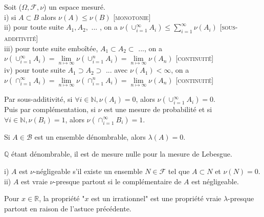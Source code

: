 \documentclass[landscape,twocolumn]{article}
\begin{document}
\begin{prop}
Soit ($\Omega, \mathcal{F}, \nu $) un espace mesuré. \\
i) si $A \subset B$ alors $\nu(A) \leqslant \nu(B)$ \textsc{[monotonie]} \\
ii) pour toute suite $A_1, A_2,$ ... , on a $\nu ( \cup_{i=1}^{\infty} A_i) \leqslant \sum \limits_{i=1}^{\infty} \nu (A_i)$ \textsc{[sous-additivité]} \\
iii) pour toute suite emboîtée, $A_1 \subset A_2 \subset$ ..., on a \\
 $\nu ( \cup_{i=1}^{\infty} A_i) = \lim \limits_{n \mapsto \infty} \nu( \cup_{i=1}^{n} A_i) = \lim \limits_{n \mapsto \infty} \nu (A_n)$ \textsc{[continuité]} \\
iv) pour toute suite $A_1 \supset A_2 \supset$ ... avec $\nu (A_1) < \infty$, on a \\
$\nu ( \cap_{i=1}^{\infty} A_i) = \lim \limits_{n \mapsto \infty} \nu ( \cap_{i=1}^{n} A_i) = \lim \limits_{n \mapsto \infty} \nu (A_n)$ \textsc{[continuité]}
\end{prop}

\begin{lemme}
Par sous-additivité, si $\forall i \in \mathbb{N}, \nu (A_i) = 0$, alors $\nu (\cup_{i=1}^{\infty} A_i)=0$. \\
Puis par complémentation, si $\nu$ est une mesure de probabilité et si $\forall i \in \mathbb{N}, \nu (B_i)=1$, alors $\nu (\cap_{i=1}^{\infty} B_i)=1$.
\end{lemme}

\begin{coro}
Si $A \in \mathcal{B}$ est un ensemble dénombrable, alors $\lambda (A) =0$.
\end{coro}

\begin{astu}
$\mathbb{Q}$ étant dénombrable, il est de mesure nulle pour la mesure de Lebesgue.
\end{astu}

\begin{defin}
i) $A$ est $\nu$-négligeable s'il existe un ensemble $N \in \mathcal{F}$ tel que $A \subset N$ et $\nu (N)=0$. \\
ii) $A$ est vraie $\nu$-presque partout si le complémentaire de $A$ est négligeable.
\end{defin}

\begin{exe}
Pour $x \in \mathbb{R}$, la propriété "$x$ est un irrationnel" est une propriété vraie $\lambda$-presque partout en raison de l'astuce précédente.
\end{exe}
\end{document}
